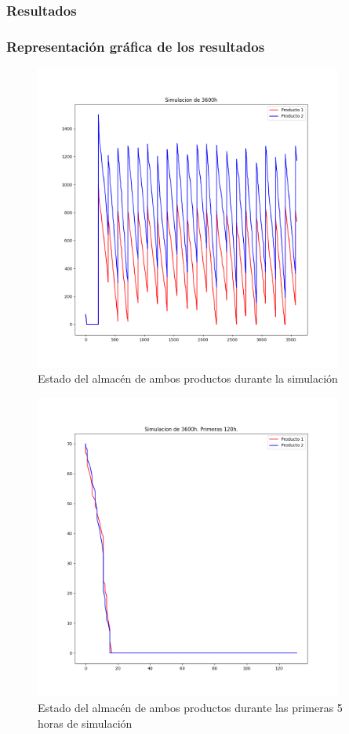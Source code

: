 \documentclass[a4paper,12pt]{article}
\begin{document}
	\subsubsection{Resultados}
	
	
	\subsubsection{Representación gráfica de los resultados}
	
	\begin{figure}[H]
		\centering
		\includegraphics[width=0.9\textwidth]{include/sim.png}
		\caption{Estado del almacén de ambos productos durante la simulación}
	\end{figure}
	
	\begin{figure}[H]
		\centering
		\includegraphics[width=0.9\textwidth]{include/sim_first5h.png}
		\caption{Estado del almacén de ambos productos durante las primeras 5 horas de simulación}
	\end{figure}
\end{document}
